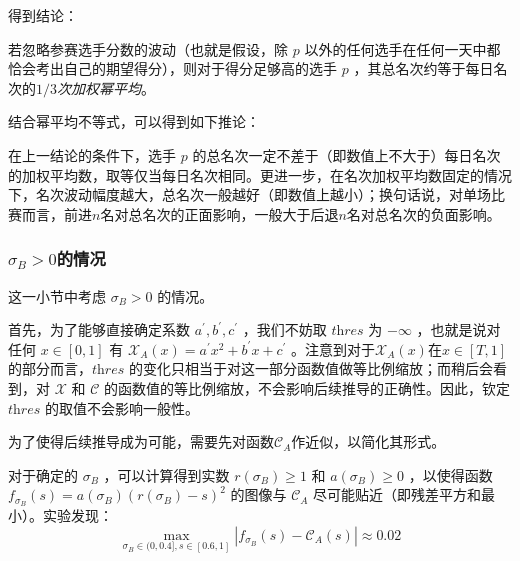            得到结论：

            \begin{tcolorbox}[colback=white,colframe=black,boxrule=0.5pt,arc=0pt]
                若忽略参赛选手分数的波动（也就是假设，除 $p$ 以外的任何选手在任何一天中都恰会考出自己的期望得分），则对于得分足够高的选手 $p$ ，其总名次约等于每日名次的\emph{$1/3$次加权幂平均}。
            \end{tcolorbox}

            结合幂平均不等式\cite{wiki_powerMean}，可以得到如下推论：
            
            \begin{tcolorbox}[colback=white,colframe=black,boxrule=0.5pt,arc=0pt]
                在上一结论的条件下，选手 $p$ 的总名次一定不差于（即数值上不大于）每日名次的加权平均数，取等仅当每日名次相同。更进一步，在名次加权平均数固定的情况下，名次波动幅度越大，总名次一般越好（即数值上越小）；换句话说，对单场比赛而言，前进$n$名对总名次的正面影响，一般大于后退$n$名对总名次的负面影响。
            \end{tcolorbox}

        \subsubsection{$\sigma_B>0$的情况}

            这一小节中考虑 $\sigma_B>0$ 的情况。

            \vspace{1.5ex}
            
            首先，为了能够直接确定系数 $a^\prime,b^\prime,c^\prime$ ，我们不妨取 $\textit{thres}$ 为 $-\infty$ ，也就是说对任何 $x\in [0,1]$ 有 $\mathcal{X}_A(x)=a^\prime x^2+b^\prime x+c^\prime$ 。注意到对于$\mathcal{X}_A(x)$在$x\in [T,1]$的部分而言，$\textit{thres}$ 的变化只相当于对这一部分函数值做等比例缩放；而稍后会看到，对 $\mathcal{X}$ 和 $\mathcal{C}$ 的函数值的等比例缩放，不会影响后续推导的正确性。因此，钦定 $\textit{thres}$ 的取值不会影响一般性。

            \vspace{1.5ex}

            为了使得后续推导成为可能，需要先对函数$\mathcal{C}_A$作近似，以简化其形式。

            对于确定的 $\sigma_B$ ，可以计算得到实数 $r(\sigma_B)\geq 1$ 和 $a(\sigma_B)\geq 0$ ，以使得函数 $f_{\sigma_B}(s)=a(\sigma_B)(r(\sigma_B)-s)^2$ 的图像与 $\mathcal{C}_A$ 尽可能贴近（即残差平方和最小）。实验发现：
            $$
            \max\limits_{\sigma_B\in (0,0.4],s\in [0.6,1]} \left|f_{\sigma_B}(s)-\mathcal{C}_A(s)\right|\approx 0.02
            $$

